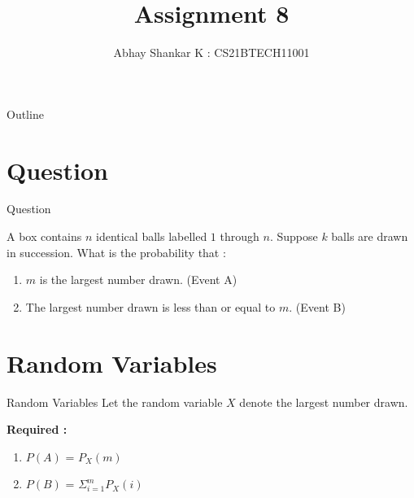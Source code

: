 \documentclass{beamer}
\DeclareMathOperator*{\pipe}{|}
\begin{document}
\newcommand{\bfr}[2]{\section{#1} \begin{frame}{#1} #2 \end{frame}}

	\title{Assignment 8}
		\author{ Abhay Shankar K : CS21BTECH11001}

	\begin{frame}
    		\titlepage 
	\end{frame}

	\begin{frame}{Outline}
    		\tableofcontents
	\end{frame}

	\providecommand{\brak}[1]{\ensuremath{\left(#1\right)}}
	\providecommand{\sbrak}[1]{\ensuremath{\left[#1\right]}}
	\providecommand{\cbrak}[1]{\ensuremath{\left\{#1\right\}}}
	\providecommand{\req}{\textbf{Required :}}
	\providecommand{\rpr}[2]{\ensuremath{P_{#1}\left(#2\right)}} %
	\providecommand{\spr}[1]{\ensuremath{P\left(#1\right)}} %
	\providecommand{\cpr}[2]{\ensuremath{\spr{#1 \pipe #2}}} %
	\newcommand*{\permcomb}[4][0mu]{{{}^{#3}\mkern#1#2_{#4}}}
	\newcommand*{\perm}[1][-3mu]{\permcomb[#1]{P}}
	\newcommand*{\comb}[1][-1mu]{\permcomb[#1]{C}}
	
	\bfr{Question}{
	
	A box contains $n$ identical balls labelled $1$ through $n$. Suppose $k$ balls are drawn in succession. What is the probability that :
	\begin{enumerate}[label = \brak{\textbf{\roman*}}]
	
		\item $m$ is the largest number drawn. (Event A)
		
		\item The largest number drawn is less than or equal to $m$. (Event B)
		
	\end{enumerate}
	
	}

		
	\bfr{Random Variables}{	
	Let the random variable $X$ denote the largest number drawn.
	
	\req 
	
	\begin{enumerate}[label = \brak{\textbf{\roman*}}]
	
		\item \spr{A} = \rpr{X}{m}
	
		\item \spr{B} = $\Sigma_{i = 1}^{m} \rpr{X}{i}$
		
	\end{enumerate}
	}
	
\end{document}
